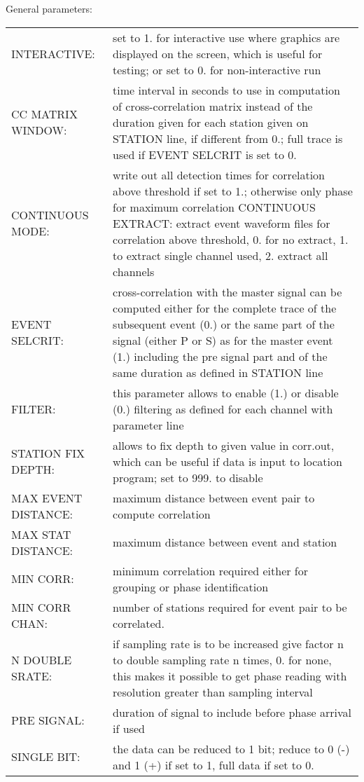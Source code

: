 General parameters: 

\begin{tabular}{lp{8.0cm}}
INTERACTIVE: & set to 1. for interactive use where graphics are 
               displayed on the screen, which is useful for testing; 
               or set to 0. for non-interactive run \\
CC MATRIX WINDOW: & time interval in seconds to use in computation of cross-correlation matrix instead of the duration given for each station given on STATION line, if different from 0.; full trace is used if EVENT SELCRIT is set to 0. \\
CONTINUOUS MODE: & write out all detection times for correlation above threshold if set to 1.; otherwise only phase for maximum correlation CONTINUOUS EXTRACT: extract event waveform files for correlation above threshold, 0. for no extract, 1. to extract single channel used, 2. extract all channels  \\
EVENT SELCRIT: & cross-correlation with the master signal can be computed either for the complete trace of the subsequent event (0.) or the same part of the signal (either P or S) as for the master event (1.) including the pre signal part and of the same duration as defined in STATION line \\
FILTER: & this parameter allows to enable (1.) or disable (0.) filtering as defined for each channel with parameter line \\
STATION FIX DEPTH: & allows to fix depth to given value in corr.out, which 
                    can be useful if data is input to 
                    location program; set to 999. to disable \\
MAX EVENT DISTANCE: & maximum distance between event pair to compute correlation \\
MAX STAT DISTANCE: & maximum distance between event and station \\
MIN CORR:&  minimum correlation required either for grouping or phase identification \\
MIN CORR CHAN: & number of stations required for event pair to be correlated. \\
N DOUBLE SRATE: & if sampling rate is to be increased give factor n to double sampling rate n times, 
0. for none, this makes it possible to get phase reading with resolution greater than 
sampling interval \\
PRE SIGNAL: & duration of signal to include before phase arrival if used \\
SINGLE BIT: & the data can be reduced to 1 bit; reduce to 0 (-) and 1 (+) if set to 1, full data if set to 0.  \\

\end{tabular}
